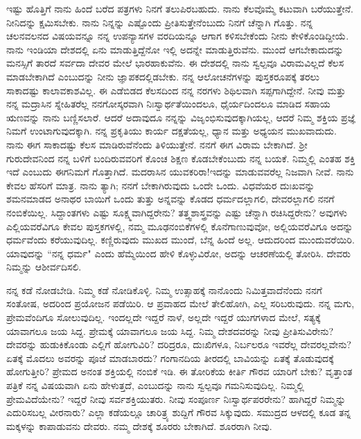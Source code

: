 ಇಷ್ಟು ಹೊತ್ತಿಗೆ ನಾನು ಹಿಂದೆ ಬರೆದ ಪತ್ರಗಳು ನಿನಗೆ ತಲುಪಿರಬಹುದು. ನಾನು ಕೆಲವೊಮ್ಮೆ ಕಟುವಾಗಿ ಬರೆಯುತ್ತೇನೆ. ನೀನಿದನ್ನು ಕ್ಷಮಿಸಬೇಕು. ನಾನು ನಿನ್ನನ್ನು ಎಷ್ಟೊಂದು ಪ್ರೀತಿಸುತ್ತೇನೆಂಬುದು ನಿನಗೆ ಚೆನ್ನಾಗಿ ಗೊತ್ತು. ನನ್ನ ಚಲನವಲನದ ವಿಷಯವನ್ನೂ ನನ್ನ ಉಪನ್ಯಾಸಗಳ ವರದಿಯನ್ನೂ ಆಗಾಗ ಕಳಿಸಬೇಕೆಂದು ನೀನು ಕೇಳಿಕೊಂಡಿದ್ದೀಯೆ. ನಾನು ಇಂಡಿಯಾ ದೇಶದಲ್ಲಿ ಏನು ಮಾಡುತ್ತಿದ್ದೆನೋ ಇಲ್ಲಿ ಅದನ್ನೇ ಮಾಡುತ್ತಿರುವೆನು. ಮುಂದೆ ಆಗಬೇಕಾದುದನ್ನು ಮನಸ್ಸಿಗೆ ತಾರದೆ ಸರ್ವದಾ ದೇವರ ಮೇಲೆ ಭಾರಹಾಕುವೆನು. ಈ ದೇಶದಲ್ಲಿ ನಾನು ಸ್ವಲ್ಪವೂ ವಿರಾಮವಿಲ್ಲದೆ ಕೆಲಸ ಮಾಡಬೇಕಾಗಿದೆ ಎಂಬುದನ್ನು ನೀನು ಜ್ಞಾಪಕದಲ್ಲಿಡಬೇಕು. ನನ್ನ ಆಲೋಚನೆಗಳನ್ನು ಪುಸ್ತಕರೂಪಕ್ಕೆ ತರಲು ಸಾಕಾದಷ್ಟು ಕಾಲಾವಕಾಶವಿಲ್ಲ. ಈ ಎಡೆಬಿಡದ ಕೆಲಸದಿಂದ ನನ್ನ ನರಗಳು ಶಿಥಿಲವಾಗಿ ಸಪ್ಪಗಾಗಿದ್ದೇನೆ. ನೀವು ಮತ್ತು ನನ್ನ ಮದ್ರಾಸಿನ ಸ್ನೇಹಿತರೆಲ್ಲ ನನಗೋಸ್ಕರವಾಗಿ ನಿಃಸ್ವಾರ್ಥತೆಯಿಂದಲೂ, ಧೈರ್ಯದಿಂದಲೂ ಮಾಡಿದ ಸಹಾಯ ಋಣವನ್ನು ನಾನು ಬಣ್ಣಿಸಲಾರೆ. ಆದರೆ ಅದಾವುದೂ ನನ್ನನ್ನು ವಿಜೃಂಭಿಸುವುದಕ್ಕಾಗಿಯಲ್ಲ, ಆದರೆ ನಿಮ್ಮ ಶಕ್ತಿಯ ಪ್ರಜ್ಞೆ ನಿಮಗೆ ಉಂಟಾಗುವುದಕ್ಕಾಗಿ. ನನ್ನ ಪ್ರಕೃತಿಯು ಕಾರ್ಯ ದಕ್ಷತೆಯಲ್ಲ, ಧ್ಯಾನ ಮತ್ತು ಅಧ್ಯಯನ ಮುಖವಾದುದು. ನಾನು ಈಗ ಸಾಕಾದಷ್ಟು ಕೆಲಸ ಮಾಡಿರುವೆನೆಂದು ತಿಳಿಯುತ್ತೇನೆ. ನನಗೆ ಈಗ ವಿರಾಮ ಬೇಕಾಗಿದೆ. ಶ‍್ರೀ ಗುರುದೇವನಿಂದ ನನ್ನ ಬಳಿಗೆ ಬಂದಿರುವವರಿಗೆ ಕೊಂಚ ಶಿಕ್ಷಣ ಕೊಡಬೇಕೆಂಬುದು ನನ್ನ ಬಯಕೆ. ನಿಮ್ಮಲ್ಲಿ ಎಂತಹ ಶಕ್ತಿ ಇದೆ ಎಂಬುದು ಈಗನಿಮಗೆ ಗೊತ್ತಾಗಿದೆ. ಮದರಾಸಿನ ಯುವಕರಿರಾ!ಇದನ್ನು ಮಾಡುವವರೆಲ್ಲ ನಿಜವಾಗಿ ನೀವೆ. ನಾನು ಕೇವಲ ಹೆಸರಿಗೆ ಮಾತ್ರ. ನಾನು ತ್ಯಾಗಿ; ನನಗೆ ಬೇಕಾಗಿರುವುದು ಒಂದೇ ಒಂದು. ವಿಧವೆಯರ ದುಃಖವನ್ನು ಶಮನಮಾಡದ ಅನಾಥರ ಬಾಯಿಗೆ ಒಂದು ತುತ್ತು ಅನ್ನವನ್ನು ಕೊಡದ ಧರ್ಮದಲ್ಲಾಗಲಿ, ದೇವರಲ್ಲಾಗಲಿ ನನಗೆ ನಂಬಿಕೆಯಿಲ್ಲ. ಸಿದ್ದಾಂತಗಳು ಎಷ್ಟು ಸೂಕ್ಷ್ಮವಾಗಿದ್ದರೇನು? ತತ್ತ್ವಶಾಸ್ತ್ರವನ್ನು ಎಷ್ಟು ಚೆನ್ನಾಗಿ ರಚಿಸಿದ್ದರೇನು? ಅವುಗಳು ಎಲ್ಲಿಯವರೆವಿಗೂ ಕೇವಲ ಪುಸ್ತಕಗಳಲ್ಲಿ, ನಮ್ಮ ಮೂಢನಂಬಿಕೆಗಳಲ್ಲಿ ಕೊನೆಗಾಣುವುವೋ, ಅಲ್ಲಿಯವರೆವಿಗೂ ಅದನ್ನು ಧರ್ಮವೆಂದು ಕರೆಯುವುದಿಲ್ಲ. ಕಣ್ಣಿರುವುದು ಮುಖದ ಮುಂದೆ, ಬೆನ್ನ ಹಿಂದೆ ಅಲ್ಲ. ಆದುದರಿಂದ ಮುಂದುವರೆಯಿರಿ. ಯಾವುದನ್ನು ``ನನ್ನ ಧರ್ಮ" ಎಂದು ಹೆಮ್ಮೆಯಿಂದ ಹೇಳಿ ಕೊಳ್ಳುವಿರೋ, ಅದನ್ನು ಆಚರಣೆಯಲ್ಲಿ ತೋರಿಸಿ. ದೇವರು ನಿಮ್ಮನ್ನು ಆಶೀರ್ವದಿಸಲಿ.

ನನ್ನ ಕಡೆ ನೋಡಬೇಡಿ. ನಿಮ್ಮ ಕಡೆ ನೋಡಿಕೊಳ್ಳಿ. ನಿಮ್ಮ ಉತ್ಸಾಹಕ್ಕೆ ನಾನೊಂದು ನಿಮಿತ್ತವಾದೆನೆಂದು ನನಗೆ ಸಂತೋಷ, ಅದರಿಂದ ಪ್ರಯೋಜನ ಪಡೆಯಿರಿ. ಆ ಪ್ರವಾಹದ ಮೇಲೆ ತೇಲಿಹೋಗಿ, ಎಲ್ಲ ಸರಿಬರುವುದು. ನನ್ನ ಮಗು, ಪ್ರೇಮವೆಂದಿಗೂ ಸೋಲುವುದಿಲ್ಲ. ಇಂದಲ್ಲದೇ ಇದ್ದರೆ ನಾಳೆ, ಅಲ್ಲದೇ ಇದ್ದರೆ ಯುಗಗಳಾದ ಮೇಲೆ, ಸತ್ಯಕ್ಕೆ ಯಾವಾಗಲೂ ಜಯ ಸಿದ್ದ. ಪ್ರೇಮಕ್ಕೆ ಯಾವಾಗಲೂ ಜಯ ಸಿದ್ದ. ನಿಮ್ಮ ದೇಶದವರನ್ನು ನೀವು ಪ್ರೀತಿಸುವಿರೇನು? ದೇವರನ್ನು ಹುಡುಕಿಕೊಂಡು ಎಲ್ಲಿಗೆ ಹೋಗುವಿರಿ? ದರಿದ್ರರೂ, ದುಃಖಿಗಳೂ, ನಿರ್ಬಲರೂ ಇವರೆಲ್ಲ ದೇವರಲ್ಲವೇನು? ಏತಕ್ಕೆ ಮೊದಲು ಅವರನ್ನು ಪೂಜೆ ಮಾಡಬಾರದು? ಗಂಗಾನದಿಯ ತೀರದಲ್ಲಿ ಬಾವಿಯನ್ನು ಏತಕ್ಕೆ ತೊಡುವುದಕ್ಕೆ ಹೋಗುತ್ತೀರಿ? ಪ್ರೇಮದ ಅನಂತ ಶಕ್ತಿಯಲ್ಲಿ ನಂಬಿಕೆ ಇಡಿ. ಈ ತೋರಿಕೆಯ ಕೀರ್ತಿ ಗೌರವ ಯಾರಿಗೆ ಬೇಕು? ವೃತ್ತಾಂತ ಪತ್ರಿಕೆ ನನ್ನ ವಿಷಯವಾಗಿ ಏನು ಹೇಳುತ್ತದೆ, ಎಂಬುದನ್ನು ನಾನು ಸ್ವಲ್ಪವೂ ಗಮನಿಸುವುದಿಲ್ಲ. ನಿಮ್ಮಲ್ಲಿ ಪ್ರೇಮವಿದೆಯೇನು? ಇದ್ದರೆ ನೀವು ಸರ್ವಶಕ್ತಿಯುತರು. ನೀವು ಸಂಪೂರ್ಣ ನಿಃಸ್ವಾರ್ಥಪರರೇನು? ಹಾಗಿದ್ದರೆ ನಿಮ್ಮನ್ನು ಎದುರಿಸಬಲ್ಲ ವೀರನಾರು? ಎಲ್ಲಾ ಕಡೆಯಲ್ಲೂ ಚಾರಿತ್ರ್ಯ ಶುದ್ದಿಗೆ ಗೌರವ ಸಿಕ್ಕುವುದು. ಸಮುದ್ರದ ಆಳದಲ್ಲಿ ಕೂಡ ತನ್ನ ಮಕ್ಕಳನ್ನು ಕಾಪಾಡುವನು ದೇವರು. ನಮ್ಮ ದೇಶಕ್ಕೆ ಶೂರರು ಬೇಕಾಗಿದೆ. ಶೂರರಾಗಿ ನೀವು.

